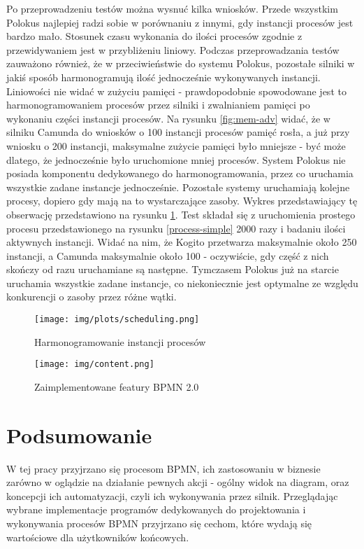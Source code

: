 \documentclass[declaration,shortabstract,mgr]{iithesis}
\newcommand{\bpmn}{BPMN }
\newcommand{\bpmnnospace}{BPMN}
\begin{document}
Po przeprowadzeniu testów można wysnuć kilka wniosków. Przede wszystkim Polokus najlepiej radzi sobie w porównaniu z innymi, gdy instancji procesów jest bardzo mało. Stosunek czasu wykonania do ilości procesów zgodnie z przewidywaniem jest w przybliżeniu liniowy. Podczas przeprowadzania testów zauważono również, że w przeciwieństwie do systemu Polokus, pozostałe silniki w jakiś sposób harmonogramują ilość jednocześnie wykonywanych instancji. Liniowości nie widać w zużyciu pamięci - prawdopodobnie spowodowane jest to harmonogramowaniem procesów przez silniki i zwalnianiem pamięci po wykonaniu części instancji procesów. Na rysunku \ref{fig:mem-adv} widać, że w silniku Camunda do wniosków o 100 instancji procesów pamięć rosła, a już przy wniosku o 200 instancji, maksymalne zużycie pamięci było mniejsze - być może dlatego, że jednocześnie było uruchomione mniej procesów. System Polokus nie posiada komponentu dedykowanego do harmonogramowania, przez co uruchamia wszystkie zadane instancje jednocześnie. Pozostałe systemy uruchamiają kolejne procesy, dopiero gdy mają na to wystarczające zasoby. Wykres przedstawiający tę obserwację przedstawiono na rysunku \ref{fig:scheduling}. Test składał się z uruchomienia prostego procesu przedstawionego na rysunku \ref{process-simple} 2000 razy i badaniu ilości aktywnych instancji. Widać na nim, że Kogito przetwarza maksymalnie około 250 instancji, a Camunda maksymalnie około 100 - oczywiście, gdy część z nich skończy od razu uruchamiane są następne. Tymczasem Polokus już na starcie uruchamia wszystkie zadane instancje, co niekoniecznie jest optymalne ze względu konkurencji o zasoby przez różne wątki.

\begin{figure}[h]
     \centering
     \texttt{[image: img/plots/scheduling.png]}
     \caption{Harmonogramowanie instancji procesów}
     \label{fig:scheduling}
\end{figure}

\newpage
\begin{figure}[H]
    \texttt{[image: img/content.png]}
    \caption{Zaimplementowane featury \bpmn 2.0}
    \label{fig:features}
\end{figure}

\chapter{Podsumowanie}
W tej pracy przyjrzano się procesom \bpmnnospace, ich zastosowaniu w biznesie zarówno w oglądzie na działanie pewnych akcji - ogólny widok na diagram, oraz koncepcji ich automatyzacji, czyli ich wykonywania przez silnik. Przeglądając wybrane implementacje programów dedykowanych do projektowania i wykonywania procesów \bpmn przyjrzano się cechom, które wydają się wartościowe dla użytkowników końcowych.
\end{document}
